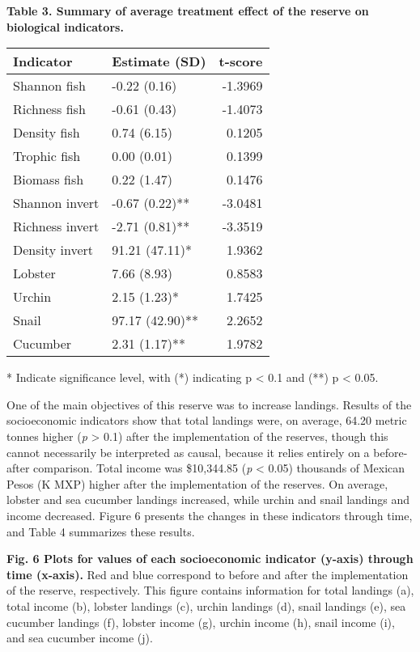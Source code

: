 \documentclass[12pt,]{article}
\begin{document}
\textbf{Table 3. Summary of average treatment effect of the reserve on
biological indicators.}

\begin{table}[H]
\centering
\begin{tabular}{l|l|r}
\hline
\bfseries{Indicator} & \bfseries{Estimate (SD)} & \bfseries{t-score}\\
\hline
Shannon fish & -0.22 (0.16) & -1.3969\\
\hline
Richness fish & -0.61 (0.43) & -1.4073\\
\hline
Density fish & 0.74 (6.15) & 0.1205\\
\hline
Trophic fish & 0.00 (0.01) & 0.1399\\
\hline
Biomass fish & 0.22 (1.47) & 0.1476\\
\hline
Shannon invert & -0.67 (0.22)** & -3.0481\\
\hline
Richness invert & -2.71 (0.81)** & -3.3519\\
\hline
Density invert & 91.21 (47.11)* & 1.9362\\
\hline
Lobster & 7.66 (8.93) & 0.8583\\
\hline
Urchin & 2.15 (1.23)* & 1.7425\\
\hline
Snail & 97.17 (42.90)** & 2.2652\\
\hline
Cucumber & 2.31 (1.17)** & 1.9782\\
\hline
\end{tabular}
\end{table}

* Indicate significance level, with (*) indicating p \textless{} 0.1 and
(**) p \textless{} 0.05.

\clearpage

One of the main objectives of this reserve was to increase landings.
Results of the socioeconomic indicators show that total landings were,
on average, 64.20 metric tonnes higher (\emph{p} \textgreater{} 0.1)
after the implementation of the reserves, though this cannot necessarily
be interpreted as causal, because it relies entirely on a before-after
comparison. Total income was \$10,344.85 (\emph{p} \textless{} 0.05)
thousands of Mexican Pesos (K MXP) higher after the implementation of
the reserves. On average, lobster and sea cucumber landings increased,
while urchin and snail landings and income decreased. Figure 6 presents
the changes in these indicators through time, and Table 4 summarizes
these results.

\textbf{Fig. 6 Plots for values of each socioeconomic indicator (y-axis)
through time (x-axis).} Red and blue correspond to before and after the
implementation of the reserve, respectively. This figure contains
information for total landings (a), total income (b), lobster landings
(c), urchin landings (d), snail landings (e), sea cucumber landings (f),
lobster income (g), urchin income (h), snail income (i), and sea
cucumber income (j).
\end{document}
